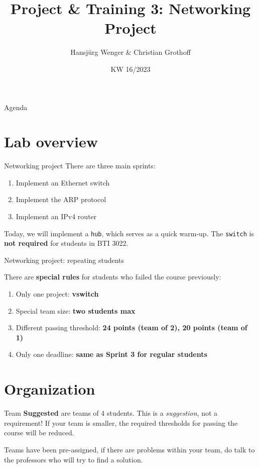 \documentclass{beamer}
\title{Project \& Training 3: Networking Project}
\date{KW 16/2023}
\author{Hansj\"urg Wenger \& Christian Grothoff}
\institute{Berner Fachhochschule}
\begin{document}
\begin{frame}
  \maketitle
\end{frame}

\begin{frame}{Agenda}
\tableofcontents
\end{frame}

\section{Lab overview}

\begin{frame}{Networking project}
There are three main sprints:
\begin{enumerate}
\item Implement an Ethernet switch
\item Implement the ARP protocol
\item Implement an IPv4 router
\end{enumerate}
Today, we will implement a {\tt hub}, which serves as a quick warm-up.
The {\tt switch} is {\bf not required} for students in BTI 3022.
\end{frame}


\begin{frame}{Networking project: repeating students}

There are {\bf special rules} for students who failed the course previously:
\begin{enumerate}
\item Only one project: {\bf vswitch}
\item Special team size: {\bf two students max}
\item Different passing threshold: {\bf 24 points (team of 2), 20 points (team of 1)}
\item Only one deadline: {\bf same as Sprint 3 for regular students}
\end{enumerate}

\end{frame}


\section{Organization}
\begin{frame}{Team}
  {\bf Suggested} are teams of 4 students.
  This is a {\em suggestion}, not a requirement!
  If your team is smaller, the required thresholds for passing the
  course will be reduced.

  Teams have been pre-assigned, if there are problems
  within your team, do talk to the professors who will
  try to find a solution.
\end{frame}
\end{document}
